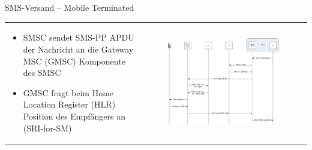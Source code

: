 \documentclass{beamer}
\begin{document}
\begin{frame}{SMS-Versand -- Mobile Terminated}

	\begin{tabular}{l l}
		\begin{minipage}{0.5\textwidth}
			\begin{itemize}
				\item SMSC sendet SMS-PP APDU der Nachricht an die Gateway MSC (GMSC) 
					Komponente des SMSC
				\item GMSC fragt beim Home Location Register (HLR) Position des 
					Empfängers an (SRI-for-SM)
			\end{itemize}
		\end{minipage}
		&
		\begin{minipage}{0.5\textwidth}
			\begin{figure}[htm]
				\includegraphics[width=\textwidth]{img/mt-forward-sm.png}
				\label{mt-forward-sm}
			\end{figure}	
		\end{minipage}
	\end{tabular}	
\end{frame}
\end{document}
